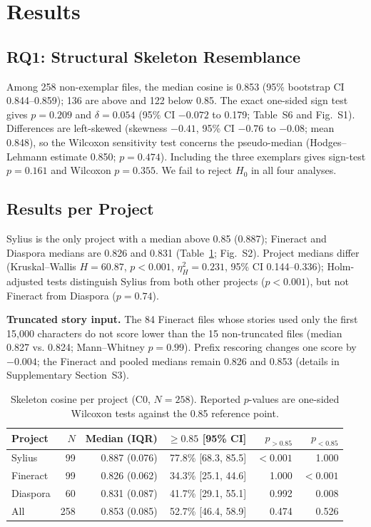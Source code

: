 \section{Results}
\label{sec:results}

\subsection{RQ1: Structural Skeleton Resemblance}

Among 258 non-exemplar files, the median cosine is 0.853 (95\% bootstrap CI 0.844--0.859); 136 are above and 122 below 0.85. The exact one-sided sign test gives $p=0.209$ and $\delta=0.054$ (95\% CI $-0.072$ to 0.179; Table~S6 and Fig.~S1). Differences are left-skewed (skewness $-0.41$, 95\% CI $-0.76$ to $-0.08$; mean 0.848), so the Wilcoxon sensitivity test concerns the pseudo-median (Hodges--Lehmann estimate 0.850; $p=0.474$). Including the three exemplars gives sign-test $p=0.161$ and Wilcoxon $p=0.355$. We fail to reject $H_0$ in all four analyses.

\subsection{Results per Project}
\label{sec:res-h1}

Sylius is the only project with a median above 0.85 (0.887); Fineract and Diaspora medians are 0.826 and 0.831 (Table~\ref{tab:domain}; Fig.~S2). Project medians differ (Kruskal--Wallis $H=60.87$, $p<0.001$, $\eta^2_H=0.231$, 95\% CI 0.144--0.336); Holm-adjusted tests distinguish Sylius from both other projects ($p<0.001$), but not Fineract from Diaspora ($p=0.74$).

\textbf{Truncated story input.} The 84 Fineract files whose stories used only the first 15,000 characters do not score lower than the 15 non-truncated files (median 0.827 vs. 0.824; Mann--Whitney $p=0.99$). Prefix rescoring changes one score by $-0.004$; the Fineract and pooled medians remain 0.826 and 0.853 (details in Supplementary Section~S3).

\begin{table}[!htbp]
\centering
\caption{Skeleton cosine per project (C0, $N=258$). Reported $p$-values are one-sided Wilcoxon tests against the 0.85 reference point.}
\label{tab:domain}
\begin{tabular}{lrrrrr}
\hline
Project & $N$ & Median (IQR) & $\geq0.85$ [95\% CI] & $p_{>0.85}$ & $p_{<0.85}$\\
\hline
Sylius & 99 & 0.887 (0.076) & 77.8\% [68.3, 85.5] & $<0.001$ & 1.000\\
Fineract & 99 & 0.826 (0.062) & 34.3\% [25.1, 44.6] & 1.000 & $<0.001$\\
Diaspora & 60 & 0.831 (0.087) & 41.7\% [29.1, 55.1] & 0.992 & 0.008\\
\hline
All & 258 & 0.853 (0.085) & 52.7\% [46.4, 58.9] & 0.474 & 0.526\\
\hline
\end{tabular}
\end{table}

